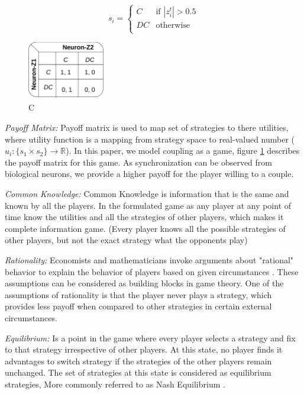 \documentclass{article}
\begin{document}
\begin{equation}
  \label{eqn: potential_strat}
  s_i =
    \begin{cases}
      C & \text{if $|z_i^t| > 0.5$}\\
      DC & \text{otherwise}\\
    \end{cases}       
\end{equation}


\begin{figure}
 \centering
 \includegraphics[width=0.3\textwidth]{payoff.png}
 \caption{C}
 \label{fig: payoff}
\end{figure}

\textit{Payoff Matrix:} Payoff matrix is used to map set of strategies to there utilities, where utility function is a mapping from strategy space to real-valued number ($u_i: \{s_1 \times s_2\} \rightarrow \mathbb{R}$). In this paper, we model coupling as a game, figure \ref{fig: payoff} describes the payoff matrix for this game. As synchronization can be observed from biological neurons, we provide a higher payoff for the player willing to a couple.   

\textit{Common Knowledge:} Common Knowledge is information that is the same and known by all the players. In the formulated game as any player at any point of time know the utilities and all the strategies of other players, which makes it complete information game. (Every player knows all the possible strategies of other players, but not the exact strategy what the opponents play)

\textit{Rationality:} Economists and mathematicians invoke arguments about "rational" behavior to explain the behavior of players based on given circumstances \cite{bicchieri2004rationality}. These assumptions can be considered as building blocks in game theory. One of the assumptions of rationality is that the player never plays a strategy, which provides less payoff when compared to other strategies in certain external circumstances.

\textit{Equilibrium:} Is a point in the game where every player selects a strategy and fix to that strategy irrespective of other players. At this state, no player finds it advantages to switch strategy if the strategies of the other players remain unchanged. The set of strategies at this state is considered as equilibrium strategies, More commonly referred to as Nash Equilibrium \cite{holt2004nash}.
\end{document}
